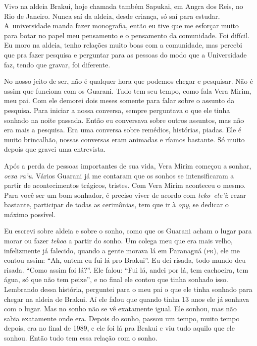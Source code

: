 Vivo na aldeia Brakui, hoje chamada também Sapukai, em Angra dos Reis,
no Rio de Janeiro. Nunca saí da aldeia, desde criança, só saí para
estudar. A~universidade manda fazer monografia, então eu tive que me
esforçar muito para botar no papel meu pensamento e o pensamento da
comunidade. Foi difícil. Eu moro na aldeia, tenho relações muito boas
com a comunidade, mas percebi que pra fazer pesquisa e perguntar para
as pessoas do modo que a Universidade faz, tendo que gravar, foi
diferente.

No nosso jeito de ser, não é qualquer hora que podemos chegar e
pesquisar. Não é assim que funciona com os Guarani. Tudo tem seu tempo,
como fala Vera Mirim, meu pai. Com ele demorei dois meses somente para
falar sobre o assunto da pesquisa. Para iniciar a nossa conversa,
sempre perguntava o que ele tinha sonhado na noite passada. Então eu
conversava sobre outros assuntos, mas não era mais a pesquisa. Era uma
conversa sobre remédios, histórias, piadas. Ele é muito brincalhão,
nossas conversas eram animadas e ríamos bastante. Só muito depois que
gravei uma entrevista. 

Após a perda de pessoas importantes de sua vida, Vera Mirim começou a
sonhar, \emph{oexa ra’u}. Vários Guarani já me contaram que os sonhos se
intensificaram a partir de acontecimentos trágicos, tristes. Com Vera
Mirim aconteceu o mesmo. Para você ser um bom sonhador, é preciso viver
de acordo com \emph{teko~ete’i}: rezar bastante, participar de todas as
cerimônias, tem que ir à \emph{opy}, se dedicar o máximo possível.

Eu escrevi sobre aldeia e sobre o sonho, como que os Guarani acham o
lugar para morar ou fazer \emph{tekoa} a partir do sonho. Um colega meu que
era mais velho, infelizmente já falecido, quando a gente morava lá em
Paranaguá (\textsc{pr}), ele me contou assim: ``Ah, ontem eu fui lá pro Brakui''.
Eu dei risada, todo mundo deu risada. ``Como assim foi lá?''. Ele falou:
``Fui lá, andei por lá, tem cachoeira, tem água, só que não tem peixe'',
e no final ele contou que tinha sonhado isso. Lembrando dessa história,
perguntei para o meu pai o que ele tinha sonhado para chegar na aldeia
de Brakui. Aí ele falou que quando tinha 13 anos ele já sonhava com o
lugar. Mas no sonho não se vê exatamente igual. Ele sonhou, mas não
sabia exatamente onde era. Depois do sonho, passou um tempo, muito
tempo depois, era no final de 1989, e ele foi lá pra Brakui e viu tudo
aquilo que ele sonhou. Então tudo tem essa relação com o sonho.


